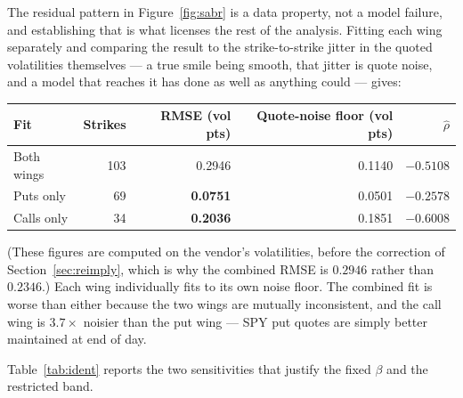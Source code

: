 \documentclass[11pt]{article}
\begin{document}
The residual pattern in Figure~\ref{fig:sabr} is a data property, not a model failure,
and establishing that is what licenses the rest of the analysis. Fitting each wing
separately and comparing the result to the strike-to-strike jitter in the quoted
volatilities themselves --- a true smile being smooth, that jitter is quote noise, and a
model that reaches it has done as well as anything could --- gives:

\begin{center}
\small
\begin{tabular}{lrrrr}
\toprule
Fit & Strikes & RMSE (vol pts) & Quote-noise floor (vol pts) & $\hat{\rho}$ \\
\midrule
Both wings & 103 & 0.2946 & 0.1140 & $-0.5108$ \\
Puts only  & 69  & \textbf{0.0751} & 0.0501 & $-0.2578$ \\
Calls only & 34  & \textbf{0.2036} & 0.1851 & $-0.6008$ \\
\bottomrule
\end{tabular}
\end{center}

\noindent (These figures are computed on the vendor's volatilities, before the correction
of Section~\ref{sec:reimply}, which is why the combined RMSE is $0.2946$ rather than
$0.2346$.) Each wing individually fits to its own noise floor. The combined fit is worse
than either because the two wings are mutually inconsistent, and the call wing is
$3.7\times$ noisier than the put wing --- SPY put quotes are simply better maintained at
end of day.

Table~\ref{tab:ident} reports the two sensitivities that justify the fixed $\beta$ and
the restricted band.
\end{document}
